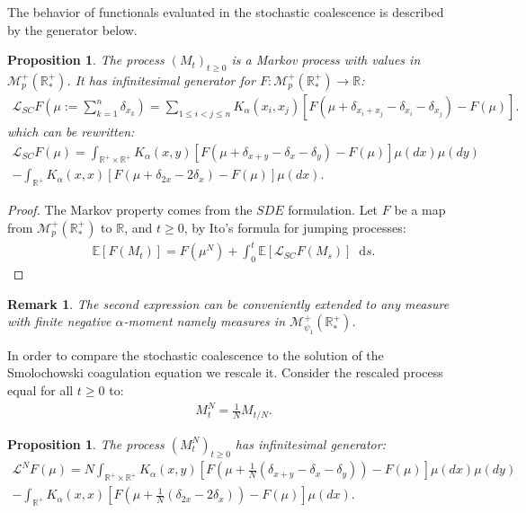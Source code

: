 \documentclass[11pt,a4paper]{article}
\newcommand{\RR}{\mathbb{R}}
\newcommand{\RRP}{\mathbb{R}^+_*}
\newcommand{\MC}{\mathcal{M}}
\newcommand{\LC}{\mathcal{L}}
\newcommand{\E}[1]{\mathbb{E}\left[#1\right]}
\newcommand{\Proc}[1]{\left(#1\right)_{t\geq 0}}
\newcommand{\dd}{\mathop{}\!\mathrm{d}}
\newtheorem{remark}[theorem]{Remark}
\newtheorem{proposition}[theorem]{Proposition}
\begin{document}
The behavior of functionals evaluated in the stochastic coalescence is described by the generator below.
\begin{proposition}
    The process $\Proc{M_t}$  is a Markov process with values in $\MC_p^+(\RRP)$. It has infinitesimal generator for $F : \MC_p^+(\RRP) \to \RR$:
    \begin{align*}
        \LC_{SC} F\left(\mu := \sum\limits_{k = 1}^n\delta_{x_k} \right) = \sum\limits_{1\le i <j \le n} K_{\alpha}(x_i,x_j) \left[F\left(\mu + \delta_{x_i + x_j} - \delta_{x_i} -\delta_{x_j}\right) - F(\mu)\right].
    \end{align*}
    which can be rewritten:
    \begin{multline*}
        \LC_{SC} F(\mu) = \int_{\RR^+ \times \RR^+} K_{\alpha}(x,y)\left[ F\left(\mu + \delta_{x+y} - \delta_x - \delta_y \right) - F(\mu) \right]\mu(dx)\mu(dy) \\
        -\int_{\RR^+} K_{\alpha}(x,x)\left[ F\left(\mu + \delta_{2x} - 2\delta_x \right) - F(\mu) \right]\mu(dx).
    \end{multline*}
\end{proposition}
\begin{proof}
    The Markov property comes from the $SDE$ formulation. Let $F$ be a map from $\MC_p^+(\RRP)$ to $\RR$, and $t \geq 0$, by Ito's formula for jumping processes:
    \begin{align*}
        \E{F(M_t)} = F(\mu^N) + \int_0^t \E{\LC_{SC} F\left(M_s\right)} \dd s.
    \end{align*}
\end{proof}
\begin{remark}
    The second expression can be conveniently extended to any measure with finite negative $\alpha$-moment namely measures in $\MC_{\psi_1}^+(\RRP)$.
\end{remark}
In order to compare the stochastic coalescence to the solution of the Smolochowski coagulation equation we rescale it. Consider the rescaled process equal for all $t \geq 0$ to:
\begin{align*}
    M^N_t = \frac{1}{N} M_{t/N}.
\end{align*}
\begin{proposition}
    The process $\Proc{M^N_{t}}$ has infinitesimal generator:
    \begin{multline*}
        \LC^N F(\mu) = N\int_{\RR^+ \times \RR^+} K_{\alpha}(x,y)\left[ F\left(\mu + \frac{1}{N}\left(\delta_{x+y} - \delta_x - \delta_y\right) \right) - F(\mu) \right]\mu(dx)\mu(dy) \\
        -\int_{\RR^+} K_{\alpha}(x,x)\left[ F\left(\mu + \frac{1}{N}\left(\delta_{2x} - 2\delta_x\right) \right) - F(\mu) \right]\mu(dx).
    \end{multline*}
\end{proposition}
\end{document}
